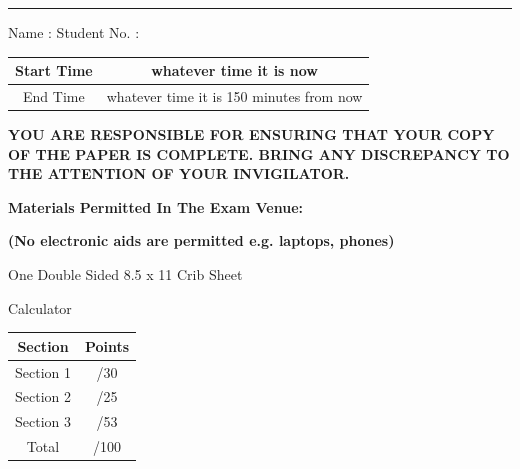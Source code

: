 \documentclass{exam}
\begin{document}


\begin{center}\noindent\rule{6in}{0.4pt}\end{center}

Name : \underline{\hspace{2.5in}} Student No. : \underline{\hspace{2in}}

\begin{center}

\vspace{20px}

\begin{tabular}{ | c | c | } 
  \hline
  Start Time & whatever time it is now \\ 
  \hline
  End Time & whatever time it is 150 minutes from now \\ 
  \hline
\end{tabular}

\vspace{10px}

\textbf{YOU ARE RESPONSIBLE FOR ENSURING THAT YOUR COPY OF THE PAPER IS COMPLETE. BRING ANY DISCREPANCY TO THE ATTENTION OF YOUR INVIGILATOR.}
\end{center}

\vspace{10px}

\textbf{Materials Permitted In The Exam Venue:}

\textbf{(No electronic aids are permitted e.g. laptops, phones)}

One Double Sided 8.5 x 11 Crib Sheet

Calculator

\vspace {70px}

\begin{center}

\Large \begin{tabular}{ || c || c || } 
  \hline
  Section & Points \\ 
  \hline
  Section 1 &   /30 \\ 
  \hline
  Section 2 &   /25 \\ 
  \hline
  Section 3 &   /53 \\ 
  \hline
  Total &   /100 \\ 
  \hline
\end{tabular}

\end{center}
\end{document}
